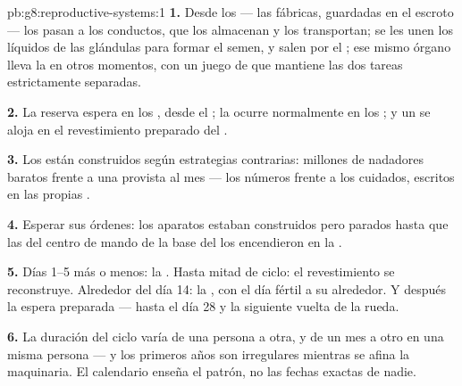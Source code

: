 \begin{solution}{pb:g8:reproductive-systems:1}
\textbf{1.} Desde los  --- las fábricas, guardadas en el
escroto --- los  pasan a los conductos, que los
almacenan y los transportan; se les unen los líquidos de las glándulas
para formar el semen, y salen por el ; ese mismo órgano lleva la
 en otros momentos, con un juego de  que mantiene las dos
tareas estrictamente separadas.

\textbf{2.} La reserva espera en los , desde el ; la
 ocurre normalmente en los ; y un  se aloja
en el revestimiento preparado del .

\textbf{3.} Los  están construidos según estrategias contrarias:
millones de nadadores baratos frente a una   provista al
mes --- los números frente a los cuidados, escritos en las propias
.

\textbf{4.} Esperar sus órdenes: los aparatos estaban construidos pero
parados hasta que las  del centro de mando de la base del
 los encendieron en la .

\textbf{5.} Días 1--5 más o menos: la . Hasta mitad de
ciclo: el revestimiento se reconstruye. Alrededor del día 14: la
, con el día fértil a su alrededor. Y después la espera
preparada --- hasta el día 28 y la siguiente vuelta de la rueda.

\textbf{6.} La duración del ciclo varía de una persona a otra, y de un
mes a otro en una misma persona --- y los primeros años son irregulares
mientras se afina la maquinaria. El calendario enseña el patrón, no las
fechas exactas de nadie.


\end{solution}
